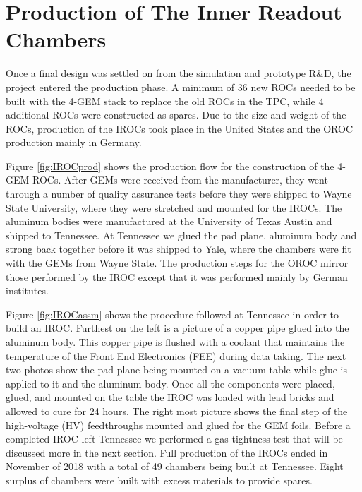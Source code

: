 \section{Production of The Inner Readout Chambers}

Once a final design was settled on from the simulation and prototype R\&D, the project entered the production phase.  A minimum of 36 new ROCs needed to be built with the 4-GEM stack to replace the old ROCs in the TPC, while 4 additional ROCs were constructed as spares.  Due to the size and weight of the ROCs, production of the IROCs took place in the United States and the OROC production mainly in Germany. 


Figure \ref{fig:IROCprod} shows the production flow for the construction of the 4-GEM ROCs.  After GEMs were received from the manufacturer, they went through a number of quality assurance tests before they were shipped to Wayne State University, where they were stretched and mounted for the IROCs.   The aluminum bodies were manufactured at the University of Texas Austin and shipped to Tennessee.  At Tennessee we glued the pad plane, aluminum body and strong back together before it was shipped to Yale, where the chambers were fit with the GEMs from Wayne State.  The production steps for the OROC mirror those performed by the IROC except that it was performed mainly by German institutes.



Figure \ref{fig:IROCassm} shows the procedure followed at Tennessee in order to build an IROC.  Furthest on the left is a picture of a copper pipe glued into the aluminum body.  This copper pipe is flushed with a coolant that maintains the temperature of the Front End Electronics (FEE) during data taking.  The next two photos show the pad plane being mounted on a vacuum table while glue is applied to it and the aluminum body.  Once all the components were placed, glued, and mounted on the table the IROC was loaded with lead bricks and allowed to cure for 24 hours.  The right most picture shows the final step of the high-voltage (HV) feedthroughs mounted and glued for the GEM foils.  Before a completed IROC left Tennessee we performed a gas tightness test that will be discussed more in the next section.  Full production of the IROCs ended in November of 2018 with a total of 49 chambers being built at Tennessee.  Eight surplus of chambers were built with excess materials to provide spares.

